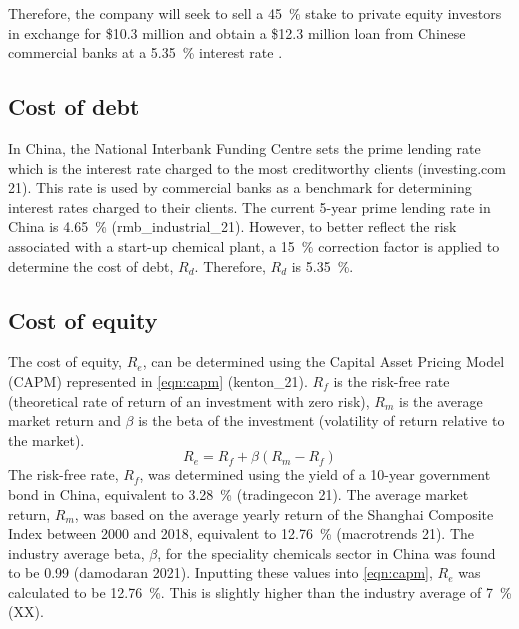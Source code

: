 Therefore, the company will seek to sell a \SI{45}{\percent} stake to private equity investors in exchange for \$10.3 million and obtain a \$12.3 million loan from Chinese commercial banks at a \SI{5.35}{\percent} interest rate \cite{rmb_industrial_21}.

\subsection{Cost of debt}
\label{sec:debt}
In China, the National Interbank Funding Centre sets the prime lending rate which is the interest rate charged to the most creditworthy clients (investing.com 21). This rate is used by commercial banks as a benchmark for determining interest rates charged to their clients. The current 5-year prime lending rate in China is \SI{4.65}{\percent} (rmb_industrial_21). However, to better reflect the risk associated with a start-up chemical plant, a \SI{15}{\percent} correction factor is applied to determine the cost of debt, $R_{d}$. Therefore, $R_{d}$ is \SI{5.35}{\percent}.

\subsection{Cost of equity}
\label{sec:equity}
The cost of equity, $R_{e}$, can be determined using the Capital Asset Pricing Model (CAPM) represented in \cref{eqn:capm} (kenton_21). $R_{f}$ is the risk-free rate (theoretical rate of return of an investment with zero risk), $R_{m}$ is the average market return and $\beta$ is the beta of the investment (volatility of return relative to the market).
\begin{equation}
\label{eqn:capm}
    R_{e}=R_{f}+\beta(R_{m}-R_{f})
\end{equation}
The risk-free rate, $R_{f}$, was determined using the yield of a 10-year government bond in China, equivalent to \SI{3.28}{\percent} (tradingecon 21). The average market return, $R_{m}$, was based on the average yearly return of the Shanghai Composite Index between 2000 and 2018, equivalent to \SI{12.76}{\percent} (macrotrends 21). The industry average beta, $\beta$, for the speciality chemicals sector in China was found to be 0.99 (damodaran 2021). Inputting these values into \cref{eqn:capm}, $R_{e}$ was calculated to be \SI{12.76}{\percent}. This is slightly higher than the industry average of \SI{7}{\percent} (XX).

